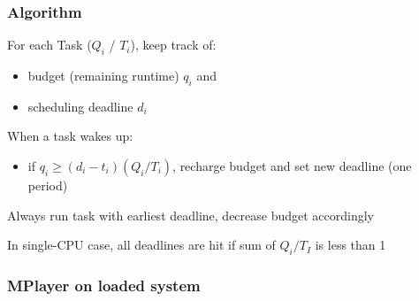 \documentclass[aspectratio=1610,xcolor=svgnames]{beamer}
\begin{document}
\appendix

\begin{frame}\frametitle{Algorithm}
  For each Task ($Q_i$ / $T_i$), keep track of:
  \begin{itemize}
  \item budget (remaining runtime) $q_i$ and
  \item scheduling deadline $d_i$
  \end{itemize}
  When a task wakes up:
  \begin{itemize}
  \item if $q_i \geq (d_i - t_i) ({Q_i} / {T_i})$, recharge budget and set new deadline (one period)
  \end{itemize}

  Always run task with earliest deadline, decrease budget accordingly

  In single-CPU case, all deadlines are hit if sum of $Q_i / T_I$
  is less than 1
\end{frame}

\begin{frame}\frametitle{MPlayer on loaded system}
  \begin{center}
    
  \end{center}
\end{frame}
\end{document}
